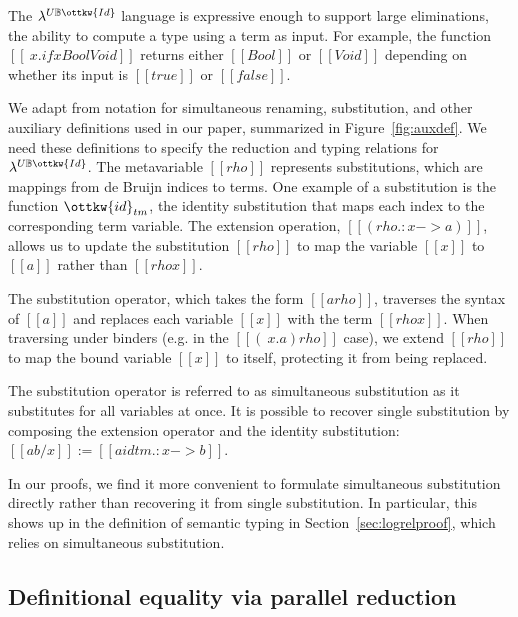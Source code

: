 \documentclass[acmsmall,screen=true,
\ifpublic review=false\else,review=true\fi
  ,anonymous=\ifanonymous true\else false\fi]{acmart}
\newcommand{\lang}{$\lambda^{U\mathbb{B}\ottkw{Id}}$\xspace}
\newcommand{\yl}[1]{}
\begin{document}

The \lang language is expressive enough to support large
eliminations, the ability to compute a type using a term as input. For
example, the function $[[\ x . if x Bool Void]]$ returns
either $[[Bool]]$ or $[[Void]]$ depending on whether its
input is $[[true]]$ or $[[false]]$.

\yl{Need to fix the de bruijn text}
We adapt from \citet{autosubst2} notation for simultaneous renaming,
substitution, and other auxiliary definitions used in our paper, summarized in
Figure~\ref{fig:auxdef}. We need these definitions to specify the reduction
and typing relations for \lang{}. The metavariable $[[rho]]$ represents
substitutions, which are mappings from de Bruijn indices to terms.  One
example of a substitution is the function $\ottkw{id}_{tm}$, the identity
substitution that maps each index to the corresponding term variable.  %
The extension operation, $[[(rho .: x -> a)]]$,
allows us to update the substitution $[[rho]]$ to map the variable
$[[x]]$ to $[[a]]$ rather than $[[rho x]]$.

The substitution operator, which takes the form $[[a {rho}]]$,
traverses the syntax of $[[a]]$ and replaces each variable $[[x]]$
with the term $[[rho x]]$. When traversing under binders (e.g. in the
$[[(\ x . a) { rho }]]$ case), we extend $[[rho]]$ to map the bound
variable $[[x]]$ to itself, protecting it from being replaced.

The substitution operator is referred to as simultaneous substitution as it
substitutes for all variables at once. It is possible to recover single
substitution by composing the extension operator and the identity
substitution: $[[a { b / x }]] := [[a { idtm .: x -> b }]]$.

\yl{Explain why iterated substitution is not good enough}

In our proofs, we find it
more convenient to formulate simultaneous substitution directly rather than
recovering it from single substitution.  In particular, this shows up in the
definition of semantic typing in Section~\ref{sec:logrelproof}, which relies
on simultaneous substitution.

\subsection{Definitional equality via parallel reduction}
\end{document}
